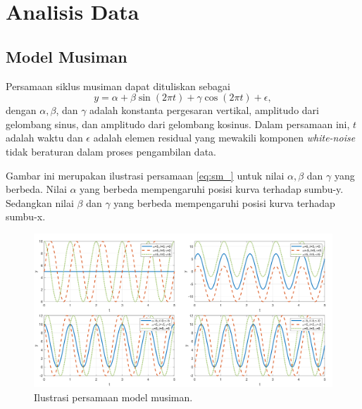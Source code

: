 \section[Analisis Data]{Analisis Data}
\begin{spacing}{1.5}
	\subsection[Model Musiman]{Model Musiman}
	 Persamaan siklus musiman \cite{crawley2012r} dapat dituliskan sebagai
	\begin{equation}\label{eq:sm_}
		y = \alpha + \beta \sin(2\pi t)+\gamma \cos(2\pi t) + \epsilon,
	\end{equation}
	dengan $\alpha, \beta$, dan $\gamma$  adalah konstanta pergesaran vertikal, amplitudo dari gelombang sinus, dan amplitudo dari gelombang kosinus. Dalam persamaan ini, $t$ adalah waktu dan $\epsilon$ adalah elemen residual yang mewakili komponen \textit{white-noise} tidak beraturan dalam proses pengambilan data. 
	
	Gambar ini merupakan ilustrasi persamaan \ref{eq:sm_} untuk nilai $\alpha,\beta$ dan $\gamma$ yang berbeda. Nilai $\alpha$ yang berbeda mempengaruhi posisi kurva terhadap sumbu-y. Sedangkan nilai $\beta$ dan $\gamma$ yang berbeda mempengaruhi posisi kurva terhadap sumbu-x.
	\begin{figure}[H]
		\centering
		\includegraphics[width=15cm]{contents/Figures/sm_experiment}
		\caption{Ilustrasi persamaan model musiman.}
		\label{fig:sm}
	\end{figure}
	

\end{spacing}
